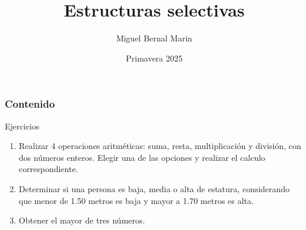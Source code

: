\documentclass[aspectratio=169]{beamer}
\title{Estructuras selectivas}
\author{Miguel Bernal Marin}
\institute[ITESO]
{
 ITESO, Universidad \\
 Jesuita de Guadalajara \\
\medskip
\textit{miguel.bernal@iteso.mx}
}
\date{
Primavera 2025
} %
\begin{document}
{ %
  \begin{frame}
  \end{frame}
}

\begin{frame}
    \titlepage
\end{frame}


\begin{frame}
    \frametitle{Contenido}
    \tableofcontents
\end{frame}



\begin{frame}[c]{Ejercicios}
  \begin{enumerate}
    \item Realizar 4 operaciones aritméticas: suma, resta, multiplicación y
      división, con dos números enteros. Elegir una de las opciones y
      realizar el calculo correspondiente.
    \item Determinar si una persona es baja, media o alta de estatura,
      considerando que menor de 1.50 metros es baja y mayor a 1.70 metros
      es alta.
    \item Obtener el mayor de tres números.
  \end{enumerate}
\end{frame}
\end{document}
